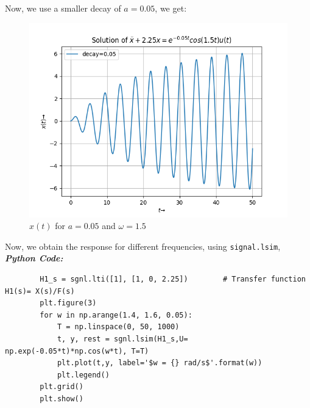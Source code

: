 \documentclass[11pt, a4paper]{article}
\begin{document}
        Now, we use a smaller decay of $a=0.05$, we get:
        \begin{figure}[H]
            \centering
            \includegraphics[scale=0.7]{Figure_2.png}
            \caption{$x(t)$ for $a=0.05$ and $\omega=1.5$}
            \label{fig:Fig2}
        \end{figure}
        Now, we obtain the response for different frequencies, using 
        \texttt{signal.lsim},\newline
                 \textit{\textbf{Python Code:}}
    \lstset{language=Python}
    \lstset{basicstyle=\footnotesize}
    \begin{lstlisting}
        H1_s = sgnl.lti([1], [1, 0, 2.25])        # Transfer function H1(s)= X(s)/F(s)
        plt.figure(3)                             
        for w in np.arange(1.4, 1.6, 0.05):     
            T = np.linspace(0, 50, 1000)
            t, y, rest = sgnl.lsim(H1_s,U= np.exp(-0.05*t)*np.cos(w*t), T=T)
            plt.plot(t,y, label='$w = {} rad/s$'.format(w))
            plt.legend()
        plt.grid()
        plt.show()
\end{lstlisting}
\end{document}
